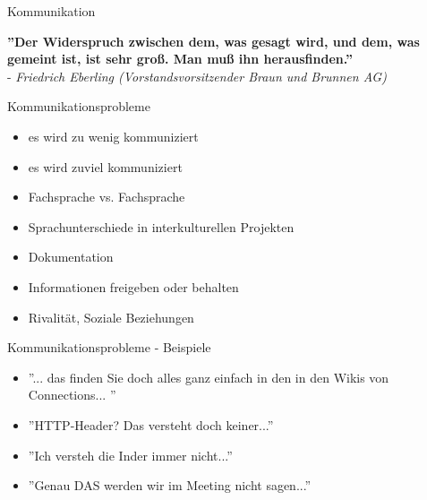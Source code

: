\documentclass[12pt]{beamer}
\begin{document}

	\begin{frame}{Kommunikation}
		
		\textbf{''Der Widerspruch zwischen dem, was gesagt wird, und dem, was gemeint ist, ist sehr groß. Man muß ihn herausfinden.''}\\ 
		- \textit{Friedrich Eberling (Vorstandsvorsitzender Braun und Brunnen AG)}
	\end{frame}

	\begin{frame}{Kommunikationsprobleme}
		\begin{itemize}
			\item{es wird zu wenig kommuniziert}
			\item{es wird zuviel kommuniziert}
			\item{Fachsprache vs. Fachsprache}
			\item{Sprachunterschiede in interkulturellen Projekten}
			\item{Dokumentation}
			\item{Informationen freigeben oder behalten}
			\item{Rivalität, Soziale Beziehungen}
		\end{itemize}
	\end{frame}
	
	\begin{frame}{Kommunikationsprobleme - Beispiele}
		\begin{itemize}
			\item{''... das finden Sie doch alles ganz einfach in den in den Wikis von Connections... ''}
			\item{''HTTP-Header? Das versteht doch keiner...''}
			\item{''Ich versteh die Inder immer nicht...''}
			\item{''Genau DAS werden wir im Meeting nicht sagen...''}
		\end{itemize}

	\end{frame}
	
\end{document}
